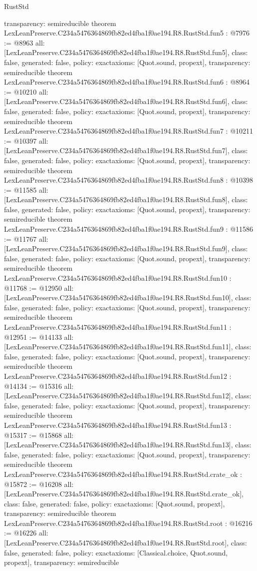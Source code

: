 \begin{lexlean}{RustStd}
\begin{coremodule}
{  transparency: semireducible
}
theorem LexLeanPreserve.C234a5476364869fb82ed4fba1f0ae194.R8.RustStd.fun5 : @7976 := @8963 {
  all: [LexLeanPreserve.C234a5476364869fb82ed4fba1f0ae194.R8.RustStd.fun5],
  class: false,
  generated: false,
  policy: exact{axioms: [Quot.sound, propext]},
  transparency: semireducible
}
theorem LexLeanPreserve.C234a5476364869fb82ed4fba1f0ae194.R8.RustStd.fun6 : @8964 := @10210 {
  all: [LexLeanPreserve.C234a5476364869fb82ed4fba1f0ae194.R8.RustStd.fun6],
  class: false,
  generated: false,
  policy: exact{axioms: [Quot.sound, propext]},
  transparency: semireducible
}
theorem LexLeanPreserve.C234a5476364869fb82ed4fba1f0ae194.R8.RustStd.fun7 : @10211 := @10397 {
  all: [LexLeanPreserve.C234a5476364869fb82ed4fba1f0ae194.R8.RustStd.fun7],
  class: false,
  generated: false,
  policy: exact{axioms: [Quot.sound, propext]},
  transparency: semireducible
}
theorem LexLeanPreserve.C234a5476364869fb82ed4fba1f0ae194.R8.RustStd.fun8 : @10398 := @11585 {
  all: [LexLeanPreserve.C234a5476364869fb82ed4fba1f0ae194.R8.RustStd.fun8],
  class: false,
  generated: false,
  policy: exact{axioms: [Quot.sound, propext]},
  transparency: semireducible
}
theorem LexLeanPreserve.C234a5476364869fb82ed4fba1f0ae194.R8.RustStd.fun9 : @11586 := @11767 {
  all: [LexLeanPreserve.C234a5476364869fb82ed4fba1f0ae194.R8.RustStd.fun9],
  class: false,
  generated: false,
  policy: exact{axioms: [Quot.sound, propext]},
  transparency: semireducible
}
theorem LexLeanPreserve.C234a5476364869fb82ed4fba1f0ae194.R8.RustStd.fun10 : @11768 := @12950 {
  all: [LexLeanPreserve.C234a5476364869fb82ed4fba1f0ae194.R8.RustStd.fun10],
  class: false,
  generated: false,
  policy: exact{axioms: [Quot.sound, propext]},
  transparency: semireducible
}
theorem LexLeanPreserve.C234a5476364869fb82ed4fba1f0ae194.R8.RustStd.fun11 : @12951 := @14133 {
  all: [LexLeanPreserve.C234a5476364869fb82ed4fba1f0ae194.R8.RustStd.fun11],
  class: false,
  generated: false,
  policy: exact{axioms: [Quot.sound, propext]},
  transparency: semireducible
}
theorem LexLeanPreserve.C234a5476364869fb82ed4fba1f0ae194.R8.RustStd.fun12 : @14134 := @15316 {
  all: [LexLeanPreserve.C234a5476364869fb82ed4fba1f0ae194.R8.RustStd.fun12],
  class: false,
  generated: false,
  policy: exact{axioms: [Quot.sound, propext]},
  transparency: semireducible
}
theorem LexLeanPreserve.C234a5476364869fb82ed4fba1f0ae194.R8.RustStd.fun13 : @15317 := @15868 {
  all: [LexLeanPreserve.C234a5476364869fb82ed4fba1f0ae194.R8.RustStd.fun13],
  class: false,
  generated: false,
  policy: exact{axioms: [Quot.sound, propext]},
  transparency: semireducible
}
theorem LexLeanPreserve.C234a5476364869fb82ed4fba1f0ae194.R8.RustStd.crate_ok : @15872 := @16208 {
  all: [LexLeanPreserve.C234a5476364869fb82ed4fba1f0ae194.R8.RustStd.crate_ok],
  class: false,
  generated: false,
  policy: exact{axioms: [Quot.sound, propext]},
  transparency: semireducible
}
theorem LexLeanPreserve.C234a5476364869fb82ed4fba1f0ae194.R8.RustStd.root : @16216 := @16226 {
  all: [LexLeanPreserve.C234a5476364869fb82ed4fba1f0ae194.R8.RustStd.root],
  class: false,
  generated: false,
  policy: exact{axioms: [Classical.choice, Quot.sound, propext]},
  transparency: semireducible
}


\end{coremodule}
\end{lexlean}
